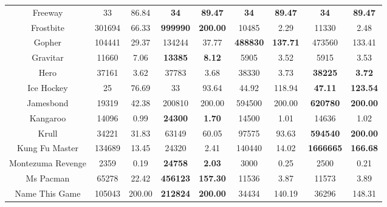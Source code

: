 \documentclass[nohyperref]{article}
\newcommand{\best}[1]{\textbf{#1}}
\theoremstyle{plain}
\begin{document}
\begin{table}[!hb]
\begin{center}
\begin{tabular}{| c | c c |  c c| c c| c c|}
 Freeway         &33           &86.84               &\textbf{34}            &\textbf{89.47 }                & \best{34}         &\best{89.47}   &\textbf{34}        &\textbf{89.47}         \\
 Frostbite       &301694       &66.33               &\textbf{999990}       &\textbf{200.00}                & 10485             &2.29            &11330     &2.48\\
 Gopher          &104441       &29.37               &134244                &37.77                          & \best{488830}     &\best{137.71}   &473560    &133.41       \\
 Gravitar        &11660        &7.06                &\textbf{13385}        &\textbf{8.12}                  & 5905              &3.52            &5915      &3.53\\
 Hero            &37161        &3.62                &37783                  &3.68                           &38330      &3.73    &\textbf{38225}     &\textbf{3.72}       \\
 Ice Hockey      &25           &76.69               &33                     &93.64                          &44.92              &118.94       &\textbf{47.11}           &\textbf{123.54}          \\
 Jamesbond       &19319        &42.38               &200810                &200.00                         &594500              &200.00   &\textbf{620780}          &\textbf{200.00}     \\
 Kangaroo        &14096        &0.99                &\textbf{24300}        &\textbf{1.70}                  & 14500             &1.01            &14636              &1.02\\
 Krull           &34221        &31.83               &63149                 &60.05                          & 97575      &93.63    &\textbf{594540}    &\textbf{200.00}       \\
 Kung Fu Master  &134689       &13.45               &24320                 &2.41                           & 140440     &14.02    &\textbf{1666665}          &\textbf{166.68}        \\
 Montezuma Revenge  &2359      &0.19                &\textbf{24758}        &\textbf{2.03}                  & 3000              &0.25            &2500            &0.21\\
 Ms Pacman          &65278     &22.42               &\textbf{456123}       &\textbf{157.30}                & 11536             &3.87            &11573           &3.89\\
 Name This Game     &105043    &200.00              &\textbf{212824}       &\textbf{200.00}                & 34434             &140.19          &36296           &148.31\\

\end{tabular}
\end{center}
\end{table}
\end{document}
